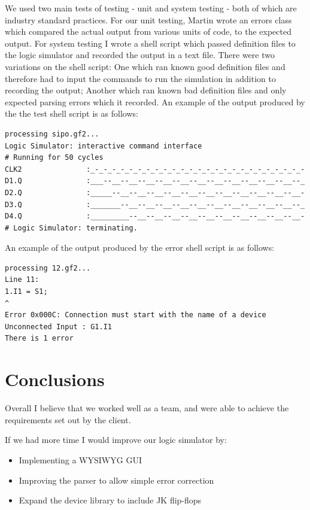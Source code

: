 \documentclass[a4paper,10pt]{article}
\begin{document}
We used two main tests of testing - unit and system testing - both of which are industry standard practices. For our unit testing, Martin wrote an errors class which compared the actual output from various units of code, to the expected output. For system testing I wrote a shell script which passed definition files to the logic simulator and recorded the output in a text file. There were two variations on the shell script: One which ran known good definition files and therefore had to input the commands to run the simulation in addition to recording the output; Another which ran known bad definition files and only expected parsing errors which it recorded. An example of the output produced by the the test shell script is as follows:

\begin{verbatim}
processing sipo.gf2...
Logic Simulator: interactive command interface
# Running for 50 cycles
CLK2               :_-_-_-_-_-_-_-_-_-_-_-_-_-_-_-_-_-_-_-_-_-_-_-_-_-
D1.Q               :___--__--__--__--__--__--__--__--__--__--__--__--_
D2.Q               :_____--__--__--__--__--__--__--__--__--__--__--__-
D3.Q               :_______--__--__--__--__--__--__--__--__--__--__--_
D4.Q               :_________--__--__--__--__--__--__--__--__--__--__-
# Logic Simulator: terminating.
\end{verbatim}

An example of the output produced by the error shell script is as follows:

\begin{verbatim}
processing 12.gf2...
Line 11:
1.I1 = S1;
^
Error 0x000C: Connection must start with the name of a device
Unconnected Input : G1.I1
There is 1 error
\end{verbatim}


\section{Conclusions}

Overall I believe that we worked well as a team, and were able to achieve the requirements set out by the client.

If we had more time I would improve our logic simulator by:

\begin{itemize}
\item Implementing a WYSIWYG GUI
\item Improving the parser to allow simple error correction
\item Expand the device library to include JK flip-flops
\end{itemize}
\end{document}
